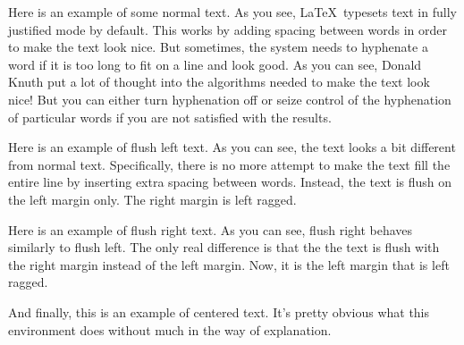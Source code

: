 \documentclass{article}
\begin{document}
Here is an example of some normal text. As you see, \LaTeX\ typesets text in fully justified mode by default. This works by adding spacing between words in order to make the text look nice. But sometimes, the system needs to hyphenate a word if it is too long to fit on a line and look good. As you can see, Donald Knuth put a lot of thought into the algorithms needed to make the text look nice! But you can either turn hyphenation off or seize control of the hyphenation of particular words if you are not satisfied with the results. \\

\begin{flushleft}
Here is an example of flush left text. As you can see, the text looks a bit different from normal text. Specifically, there is no more attempt to make the text fill the entire line by inserting extra spacing between words. Instead, the text is flush on the left margin only. The right margin is left ragged.\\

\end{flushleft}

\begin{flushright}
Here is an example of flush right text. As you can see, flush right behaves similarly to flush left. The only real difference is that the the text is flush with the right margin instead of the left margin.  Now, it is the left margin that is left ragged.\\

\end{flushright}

\begin{center}
And finally, this is an example of centered text. It's pretty obvious what this environment does without much in the way of explanation. \\

\end{center}
\end{document}
